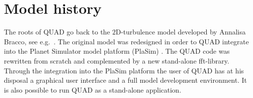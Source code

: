 \chapter{Model history}
The roots of QUAD go back to the $2$D-turbulence model developed by
Annalisa Bracco, see e.g.\ \cite{braccoandmcwilliams2010}. The original
model was redesigned in order to QUAD integrate into the Planet Simulator 
model platform (PlaSim) \cite{fraedrichetal1998}. The QUAD code was 
rewritten from scratch \cite{borthetal2016} and complemented by a 
new stand-alone fft-library. Through the integration into the PlaSim 
platform the user of QUAD has at his disposal a graphical user interface 
and a full model development environment. It is also possible to run
QUAD as a stand-alone application.
